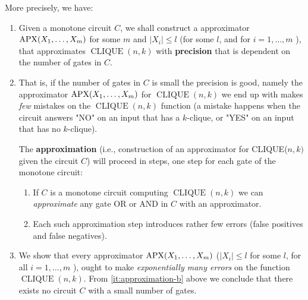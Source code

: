 More precisely, we have:  
\begin{enumerate}
 
\item  Given a monotone circuit $C$, we shall construct a approximator 
$\mathrm{APX}(X_1, \ldots, X_m)$ for some $m$ and $|{X}_{i}| \leq l$ (for some $l$, and for $i=1, \ldots, m$ ), that approximates $\operatorname{CLIQUE}({n}, {k})$ with \textbf{precision} that is dependent on the number of gates in $C$.

\item That is, if the number of gates in $C$ is small the precision is  good, namely the approximator ${\mathrm{APX}}(X_1, \ldots, X_m)$ for $\operatorname{CLIQUE}({n}, {k})$ we end up with makes \textit{few} mistakes on the $\operatorname{CLIQUE}({n}, {k})$ function (a mistake happens when the circuit  answers  "NO" on an input that has a $k$-clique, or "YES" on an input that has no $k$-clique).\label{it:approximation-b}

The \textbf{approximation} (i.e., construction of an approximator for CLIQUE(${n},{k})$ given the circuit $C$) will proceed in steps, one step for each gate of the monotone circuit:

\begin{enumerate}
    
\item If $C$ is a monotone circuit computing $\operatorname{CLIQUE}({n}, {k})$ we can \textit{approximate} any gate OR or AND in $C$ with an approximator.

\item Each such approximation step introduces rather few errors (false positives and false negatives).
\end{enumerate}



\item We show that every approximator ${\mathrm{APX}}({X}_1, \ldots, {X_m})$ ($|{X}_i| \leq l$ for some $l$, for all $i=1, \ldots, m$ ), ought to make \textit{exponentially many errors} on the function $\operatorname{CLIQUE}(n, k)$. From \ref{it:approximation-b} above we conclude that there exists no circuit $C$ with a small number of gates. 
\end{enumerate}





